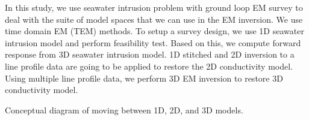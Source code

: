\documentclass{segabs}
\begin{document}
In this study, we use seawater intrusion problem with ground loop EM survey to deal with the suite of model spaces that we can use in the EM inversion. We use time domain EM (TEM) methods. To setup a survey design, we use 1D seawater intrusion model and perform feasibility test. Based on this, we compute forward response from 3D seawater intrusion model. 1D stitched and 2D inversion to a line profile data are going to be applied to restore the 2D conductivity model. Using multiple line profile data, we perform 3D EM inversion to restore 3D conductivity model.


{Conceptual diagram of moving between 1D, 2D, and 3D models.}
\end{document}
